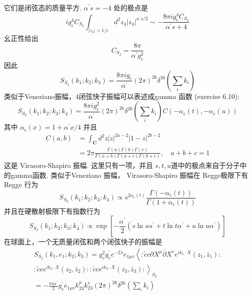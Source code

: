 它们是闭弦态的质量平方. $\alpha^{\prime} s=-4$ 处的极点是
\begin{equation}
	i g_{\mathrm{c}}^{4} C_{S_{2}} \int_{\left|z_{4}\right|>1 / \epsilon} d^{2} z_{4}\left|z_{4}\right|^{\alpha^{\prime} s / 2} \sim-\frac{8 \pi i g_{\mathrm{c}}^{4} C_{S_{2}}}{\alpha^{\prime} s+4}
\end{equation}
幺正性给出
\begin{equation}
	C_{S_{2}}=\frac{8 \pi}{\alpha^{\prime} g_{\mathrm{c}}^{2}}
\end{equation}
因此
\begin{equation}
	S_{S_{2}}\left(k_{1} ; k_{2} ; k_{3}\right)=\frac{8 \pi i g_{\mathrm{c}}}{\alpha^{\prime}}(2 \pi)^{26} \delta^{26}\left(\sum_{i} k_{i}\right)
\end{equation}
类似于Veneziano振幅，4闭弦快子振幅可以表述成gamma 函数 (exercise 6.10):
\begin{equation}
	S_{S_{2}}\left(k_{1} ; k_{2} ; k_{3} ; k_{4}\right)=\frac{8 \pi i g_{\mathrm{c}}^{2}}{\alpha^{\prime}}(2 \pi)^{26} \delta^{26}\left(\sum_{i} k_{i}\right) C\left(-\alpha_{\mathrm{c}}(t),-\alpha_{\mathrm{c}}(u)\right)
\end{equation}
其中 $\alpha_{\mathrm{c}}(x)=1+\alpha^{\prime} x / 4$ 并且
\begin{equation}
	\begin{aligned}
		C(a, b) &=\int_{\mathbf{C}} d^{2} z|z|^{2 a-2}|1-z|^{2 b-2} \\
		&=2 \pi \frac{\Gamma(a) \Gamma(b) \Gamma(c)}{\Gamma(a+b) \Gamma(a+c) \Gamma(b+c)}, \quad a+b+c=1
	\end{aligned}
\end{equation}
这是 Virasoro-Shapiro 振幅. 这里只有一项，并且 $s, t, u$道中的极点来自于分子中的gamma函数. 类似于Veneziano 振幅， Virasoro-Shapiro 振幅在 Regge极限下有Regge 行为
\begin{equation}
	S_{S_{2}}\left(k_{1} ; k_{2} ; k_{3} ; k_{4}\right) \propto s^{2 \alpha_{\mathrm{c}}(t)} \frac{\Gamma\left(-\alpha_{\mathrm{c}}(t)\right)}{\Gamma\left(1+\alpha_{\mathrm{c}}(t)\right)}
\end{equation}
并且在硬散射极限下有指数行为
\begin{equation}
	S_{S_{2}}\left(k_{1} ; k_{2} ; k_{3} ; k_{4}\right) \propto \exp \left[-\frac{\alpha^{\prime}}{2}\left(s \ln s \alpha^{\prime}+t \ln t \alpha^{\prime}+u \ln u \alpha^{\prime}\right)\right]
\end{equation}
在球面上，一个无质量闭弦和两个闭弦快子的振幅是
\begin{equation}
	\begin{array}{r}
		S_{S_{2}}\left(k_{1}, e_{1} ; k_{2} ; k_{3}\right)=g_{\mathrm{c}}^{2} g_{\mathrm{c}}^{\prime} e^{-2 \lambda} e_{1 \mu v}\left\langle: \tilde{c} c \partial X^{\mu} \bar{\partial} X^{v} e^{i k_{1} \cdot X}\left(z_{1}, \bar{z}_{1}\right):\right. \\
		\left.: \tilde{c} c e^{i k_{2} \cdot X}\left(z_{2}, \bar{z}_{2}\right):: \tilde{c} c e^{i k_{3} \cdot X}\left(z_{3}, \bar{z}_{3}\right):\right\rangle_{S_{2}} \\
		=-\frac{\pi i \alpha^{\prime}}{2} g_{\mathrm{c}}^{\prime} e_{1 \mu v} k_{23}^{\mu} k_{23}^{v}(2 \pi)^{26} \delta^{26}\left(\sum_{i} k_{i}\right)
	\end{array}
\end{equation}
